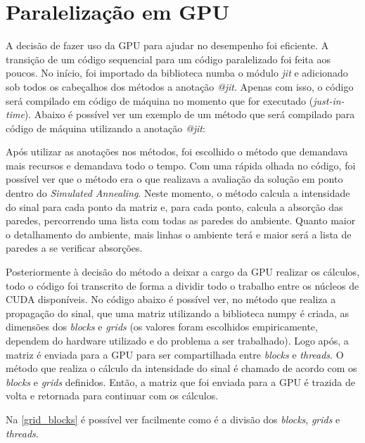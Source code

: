 \documentclass[
	12pt,				%
	openright,			%
	twoside,			%
	a4paper,			%
	english,			%
	french,				%
	spanish,			%
	brazil				%
	]{abntex2}
\begin{document}
\section[Paralelização em GPU]{Paralelização em GPU}

A decisão de fazer uso da GPU para ajudar no desempenho foi eficiente. A transição de um código sequencial para um código paralelizado foi feita aos poucos. No início, foi importado da biblioteca numba o módulo \textit{jit} e adicionado sob todos os cabeçalhos dos métodos a anotação \textit{@jit}. Apenas com isso, o código será compilado em código de máquina no momento que for executado (\textit{just-in-time}).
Abaixo é possível ver um exemplo de um método que será compilado para código de máquina utilizando a anotação \textit{@jit}:



Após utilizar as anotações nos métodos, foi escolhido o método que demandava mais recursos e demandava todo o tempo. Com uma rápida olhada no código, foi possível ver que o método era o que realizava a avaliação da solução em ponto dentro do \textit{Simulated Annealing}. Neste momento, o método calcula a intensidade do sinal para cada ponto da matriz e, para cada ponto, calcula a absorção das paredes, percorrendo uma lista com todas as paredes do ambiente. Quanto maior o detalhamento do ambiente, mais linhas o ambiente terá e maior será a lista de paredes a se verificar absorções.

Posteriormente à decisão do método a deixar a cargo da GPU realizar os cálculos, todo o código foi transcrito de forma a dividir todo o trabalho entre os núcleos de CUDA disponíveis. No código abaixo é possível ver, no método que realiza a propagação do sinal, que uma matriz utilizando a biblioteca numpy é criada, as dimensões dos \textit{blocks} e \textit{grids} (os valores foram escolhidos empiricamente, dependem do hardware utilizado e do problema a ser trabalhado). Logo após, a matriz é enviada para a GPU para ser compartilhada entre \textit{blocks} e \textit{threads}. O método que realiza o cálculo da intensidade do sinal é chamado de acordo com os \textit{blocks} e \textit{grids} definidos. Então, a matriz que foi enviada para a GPU é trazida de volta e retornada para continuar com os cálculos.



Na \autoref{grid_blocks} é possível ver facilmente como é a divisão dos \textit{blocks}, \textit{grids} e \textit{threads}.
\end{document}
